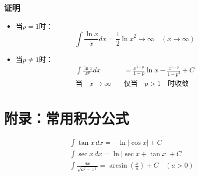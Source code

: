 \documentclass[12pt]{article}
\begin{document}
\subsubsection*{证明}
\begin{itemize}
\item 当$ p = 1 $时：
\[ \int \frac{\ln x}{x} dx = \frac{1}{2}{\ln x}^2 \to \infty \quad (x \to \infty) \]

\item 当$ p \neq 1 $时：
\begin{align*}
\int \frac{\ln x}{x^p} dx &= \frac{x^{1-p}}{1-p} \ln x - \frac{x^{1-p}}{{1-p}^2} + C \\
\text{当} \quad x \to \infty \quad &\text{仅当} \quad p > 1 \quad \text{时收敛}
\end{align*}
\end{itemize}

\section*{附录：常用积分公式}
\begin{align*}
&\int \tan x \, dx = -\ln|\cos x| + C \\
&\int \sec x \, dx = \ln|\sec x + \tan x| + C \\
&\int \frac{dx}{\sqrt{a^2-x^2}} = \arcsin\left(\frac{x}{a}\right) + C \quad (a > 0)
\end{align*}
\end{document}
